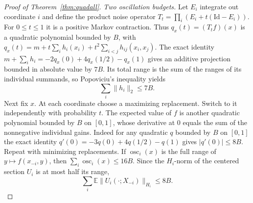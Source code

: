 \documentclass[11pt]{article}
\numberwithin{equation}{section}
\theoremstyle{remark}
\newcommand{\E}{\mathbb E}
\begin{document}
\begin{proof}[Proof of Theorem~\ref{thm:quadall}]
\emph{Two oscillation budgets.} Let $E_i$ integrate out coordinate $i$ and define the product noise operator $T_t=\prod_i(E_i+t(\mathrm{Id}-E_i))$. For $0\le t\le1$ it is a positive Markov contraction. Thus $q_x(t)=(T_tf)(x)$ is a quadratic polynomial bounded by $B$, with
$q_x(t)=m+t\sum_i h_i(x_i)+t^2\sum_{i<j}h_{ij}(x_i,x_j)$.
The exact identity $m+\sum_i h_i=-2q_x(0)+4q_x(1/2)-q_x(1)$ gives an additive projection bounded in absolute value by $7B$. Its total range is the sum of the ranges of its individual summands, so Popoviciu's inequality yields
\begin{equation}\label{eq:qadd}
 \sum_i\|h_i\|_2\le7B.
\end{equation}
Next fix $x$. At each coordinate choose a maximizing replacement. Switch to it independently with probability $t$. The expected value of $f$ is another quadratic polynomial bounded by $B$ on $[0,1]$, whose derivative at $0$ equals the sum of the nonnegative individual gains. Indeed for any quadratic $q$ bounded by $B$ on $[0,1]$ the exact identity $q'(0)=-3q(0)+4q(1/2)-q(1)$ gives $|q'(0)|\le8B$. Repeat with minimizing replacements. If $\operatorname{osc}_i(x)$ is the full range of $y\mapsto f(x_{-i},y)$, then $\sum_i\operatorname{osc}_i(x)\le16B$. Since the $H_i$-norm of the centered section $U_i$ is at most half its range,
\begin{equation}\label{eq:qosc}
 \sum_i\E\|U_i(\cdot;X_{-i})\|_{H_i}\le8B.
\end{equation}


\end{proof}
\end{document}
